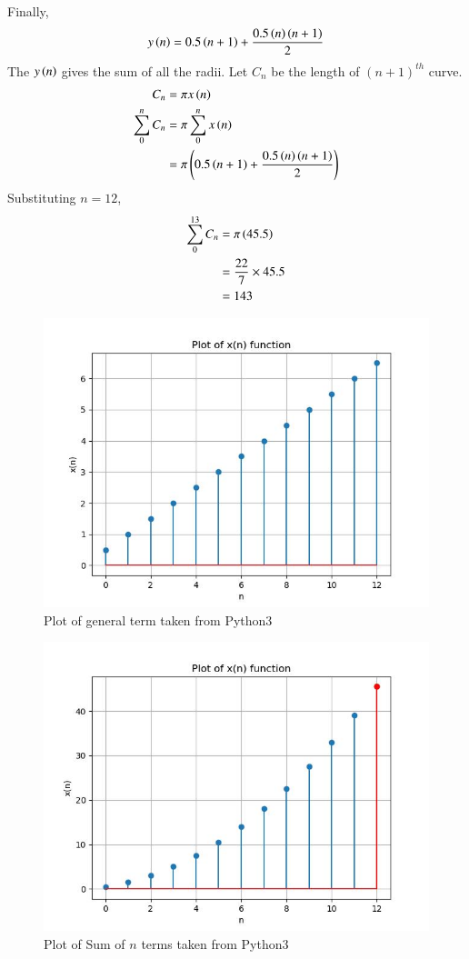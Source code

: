 \documentclass[journal,12pt,twocolumn]{IEEEtran}
\theoremstyle{remark}
\begin{document}
Finally, 
\begin{align}
    y\left(n\right) = 0.5\left(n+1\right) + \frac{0.5\left(n\right)\left(n+1\right)}{2}
\end{align}
The $y\left(n\right)$ gives the sum of all the radii.
Let $C_{n}$ be the length of $(n+1)^{th}$ curve.
\begin{align}
    C_{n} &= \pi x\left(n\right)\\
    \sum_{0}^{n}C_{n} &= \pi\sum_{0}^{n} x\left(n\right)\\
                      &= \pi\left(0.5\left(n+1\right) + \frac{0.5\left(n\right)\left(n+1\right)}{2}\right)\\
\end{align}
Substituting $n = 12$, 
\begin{align}
    \sum_{0}^{13}C_{n} &= \pi \left(45.5\right)\\
                 &= \frac{22}{7}\times45.5\\
                 &= 143
\end{align}
\begin{figure}
\renewcommand\thefigure{1}
    \centering
    \includegraphics[width=1.0\columnwidth]{figs/fig_0.jpg}
    \caption{Plot of general term taken from Python3}
    \label{fig_1}
\end{figure}
\begin{figure}
\renewcommand\thefigure{2}
    \centering
    \includegraphics[width=1.0\columnwidth]{figs/fig_1.jpg}
    \caption{Plot of Sum of $n$ terms taken from Python3}
    \label{fig_2}
\end{figure}
\end{document}
